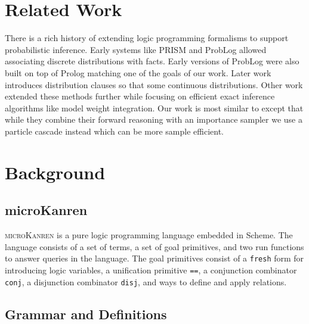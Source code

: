 \documentclass[
]{ceurart}
\begin{document}
\section{Related Work}

There is a rich history of extending logic programming formalisms to
support probabilistic inference. Early systems like
PRISM\cite{sato1997prism} and ProbLog\cite{de2007problog} allowed
associating discrete distributions with facts. Early versions of
ProbLog were also built on top of Prolog matching one of the goals of
our work. Later work\cite{gutmann2010extending} introduces
distribution clauses so that some continuous distributions. Other work
extended these methods further while focusing on efficient exact
inference algorithms like model weight
integration\cite{islam2012inference, belle2015probabilistic}. Our work
is most similar to \cite{gutmann2011magic} except that while they
combine their forward reasoning with an importance sampler we use a
particle cascade instead which can be more sample efficient.

\section{Background}

\subsection{microKanren}

\textsc{microKanren}\cite{10.1145/2989225.2989230, daniel2018reasoned}
is a pure logic programming language embedded in Scheme. The language
consists of a set of terms, a set of goal primitives, and two run
functions to answer queries in the language. The goal primitives
consist of a \texttt{fresh} form for introducing logic variables, a
unification primitive \texttt{==}, a conjunction combinator \texttt{conj}, a disjunction
combinator \texttt{disj}, and ways to define and apply relations.

\subsection{Grammar and Definitions}
\end{document}
